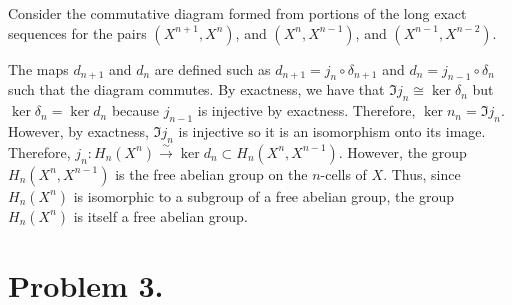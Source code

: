 \documentclass[12pt]{extarticle}
\begin{document}
Consider the commutative diagram formed from portions of the long exact sequences for the pairs $(X^{n+1},X^n)$, and $(X^{n}, X^{n-1})$, and $(X^{n-1}, X^{n-2})$. 
\begin{center}
\end{center}
The maps $d_{n+1}$ and $d_{n}$ are defined such as $d_{n+1} = j_n \circ \delta_{n+1}$ and $d_{n} = j_{n-1} \circ \delta_n$ such that the diagram commutes. By exactness, we have that $\Im{j_n} \cong \ker{\delta_n}$ but $\ker{\delta_n} = \ker{d_n}$ because $j_{n-1}$ is injective by exactness. Therefore, $\ker{n_n} = \Im{j_n}$. However, by exactness, $\Im{j_n}$ is injective so it is an isomorphism onto its image. Therefore, $j_n : H_n(X^n) \xrightarrow{\sim} \ker{d_n} \subset H_n(X^n, X^{n-1})$. However, the group $H_n(X^n, X^{n-1})$ is the free abelian group on the $n$-cells of $X$. Thus, since $H_n(X^n)$ is isomorphic to a subgroup of a free abelian group, the group $H_n(X^n)$ is itself a free abelian group.  

\section*{Problem 3.}
\end{document}
